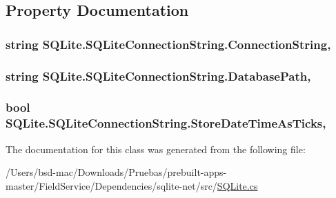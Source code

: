 \subsection{Property Documentation}
\hypertarget{class_s_q_lite_1_1_s_q_lite_connection_string_aeafe2630ba2871c730f2ea6b7cbcc15a}{
\subsubsection[{Connection\+String}]{\setlength{\rightskip}{0pt plus 5cm}string S\+Q\+Lite.\+S\+Q\+Lite\+Connection\+String.\+Connection\+String\hspace{0.3cm}{\ttfamily [get]}, {\ttfamily [set]}}}\label{class_s_q_lite_1_1_s_q_lite_connection_string_aeafe2630ba2871c730f2ea6b7cbcc15a}
\hypertarget{class_s_q_lite_1_1_s_q_lite_connection_string_aa5fb18dd049e2f5ca930f9023525734d}{
\subsubsection[{Database\+Path}]{\setlength{\rightskip}{0pt plus 5cm}string S\+Q\+Lite.\+S\+Q\+Lite\+Connection\+String.\+Database\+Path\hspace{0.3cm}{\ttfamily [get]}, {\ttfamily [set]}}}\label{class_s_q_lite_1_1_s_q_lite_connection_string_aa5fb18dd049e2f5ca930f9023525734d}
\hypertarget{class_s_q_lite_1_1_s_q_lite_connection_string_a1736975db702ccd8375cc77949511ff3}{
\subsubsection[{Store\+Date\+Time\+As\+Ticks}]{\setlength{\rightskip}{0pt plus 5cm}bool S\+Q\+Lite.\+S\+Q\+Lite\+Connection\+String.\+Store\+Date\+Time\+As\+Ticks\hspace{0.3cm}{\ttfamily [get]}, {\ttfamily [set]}}}\label{class_s_q_lite_1_1_s_q_lite_connection_string_a1736975db702ccd8375cc77949511ff3}


The documentation for this class was generated from the following file\+:\begin{DoxyCompactItemize}
\item 
/\+Users/bsd-\/mac/\+Downloads/\+Pruebas/prebuilt-\/apps-\/master/\+Field\+Service/\+Dependencies/sqlite-\/net/src/\hyperlink{_s_q_lite_8cs}{S\+Q\+Lite.\+cs}\end{DoxyCompactItemize}
